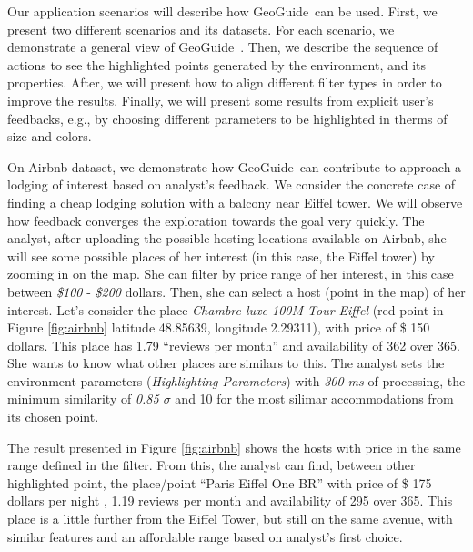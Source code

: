 \documentclass[conference,compsoc]{IEEEtran}
\newcommand{\framework}{{\sc GeoGuide}}
\begin{document}
Our application scenarios will describe how \framework\ can be used. First, we present two different scenarios and its datasets. For each scenario, we demonstrate a general view of \framework\ . Then, we describe the sequence of actions to see the highlighted points generated by the environment, and its properties. After, we will present how to align different filter types in order to improve the results. Finally, we will present some results from explicit user's feedbacks, e.g., by choosing different parameters to be highlighted in therms of size and colors.





\vspace{5pt}
 On Airbnb dataset, we demonstrate how \framework\ can contribute to approach a lodging of interest based on analyst's feedback. We consider the concrete case of finding a cheap lodging solution with a balcony near Eiffel tower. We will observe how feedback converges the exploration towards the goal very quickly. The analyst, after uploading the possible hosting locations available on Airbnb, she will see some possible places of her interest (in this case, the Eiffel tower) by zooming in on the map. She can filter by price range of her interest, in this case between \textit{\$100} - \textit{\$200} dollars. Then, she can select a host (point in the map) of her interest. Let's consider the place \textit{Chambre luxe 100M Tour Eiffel} (red point in Figure \ref{fig:airbnb} latitude 48.85639, longitude 2.29311), with price of \$ 150 dollars. This place has 1.79 ``reviews per month'' and availability of 362 over 365. She wants to know what other places are similars to this. The analyst sets the environment parameters (\textit{Highlighting Parameters}) with \textit{300 ms} of processing, the minimum similarity of \textit{0.85 $\sigma$} and 10 for the most silimar accommodations from its chosen point.

The result presented in Figure \ref{fig:airbnb} shows the hosts with price in the same range defined in the filter. From this, the analyst can find, between other highlighted point, the place/point ``Paris Eiffel One BR''  with price of \$ 175 dollars per night , 1.19 reviews per month and availability of 295 over 365. This place is a little further from the Eiffel Tower, but still on the same avenue, with similar features and an affordable range based on analyst's first choice.
\end{document}
